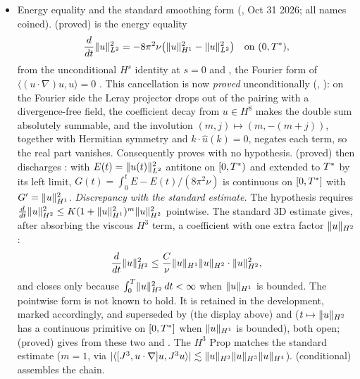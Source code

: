 \documentclass[11pt]{article}
\begin{document}
\begin{itemize}
\item Energy equality and the standard smoothing form (, Oct 31 2026; all names coined).  (proved) is the energy equality
\begin{equation}
\frac{d}{dt}\lVert u\rVert_{L^2}^2=-8\pi^2\nu\bigl(\lVert u\rVert_{H^1}^2-\lVert u\rVert_{L^2}^2\bigr)\quad\text{on }(0,T^{*}),
\end{equation}
from the unconditional $H^s$ identity at $s=0$ and , the Fourier form of $\langle (u\cdot\nabla)u,u\rangle=0$ \cite{Leray1934,Temam1977}. This cancellation is now \emph{proved} unconditionally (, ): on the Fourier side the Leray projector drops out of the pairing with a divergence-free field, the coefficient decay from $u\in H^8$ makes the double sum absolutely summable, and the involution $(m,j)\mapsto(m,-(m+j))$, together with Hermitian symmetry and $k\cdot\hat u(k)=0$, negates each term, so the real part vanishes. Consequently  proves  with no hypothesis.  (proved) then discharges : with $E(t)=\lVert u(t)\rVert_{L^2}^2$ antitone on $[0,T^{*})$ and extended to $T^{*}$ by its left limit, $G(t)=\int_0^t E-E(t)/(8\pi^2\nu)$ is continuous on $[0,T^{*}]$ with $G'=\lVert u\rVert_{H^1}^2$.
\emph{Discrepancy with the standard estimate.} The hypothesis  requires $\frac{d}{dt}\lVert u\rVert_{H^2}^2\le K(1+\lVert u\rVert_{H^1}^2)^m\lVert u\rVert_{H^2}^2$ pointwise. The standard 3D estimate \cite{Temam1995,RRS2016} gives, after absorbing the viscous $H^3$ term, a coefficient with one extra factor $\lVert u\rVert_{H^2}$:
\begin{equation}
\frac{d}{dt}\lVert u\rVert_{H^2}^2\le \frac{C}{\nu}\lVert u\rVert_{H^1}\lVert u\rVert_{H^2}\cdot\lVert u\rVert_{H^2}^2 ,
\end{equation}
and closes only because $\int_0^T\lVert u\rVert_{H^2}^2\,dt<\infty$ when $\lVert u\rVert_{H^1}$ is bounded. The pointwise form is not known to hold. It is retained in the development, marked accordingly, and superseded by  (the display above) and  ($t\mapsto\lVert u\rVert_{H^2}$ has a continuous primitive on $[0,T^{*}]$ when $\lVert u\rVert_{H^1}$ is bounded), both open;  (proved) gives  from these two and . The $H^3$ Prop matches the standard estimate ($m=1$, via $\lvert\langle[J^3,u\cdot\nabla]u,J^3u\rangle\rvert\lesssim\lVert u\rVert_{H^2}\lVert u\rVert_{H^3}\lVert u\rVert_{H^4}$).  (conditional) assembles the chain.

\end{itemize}
\end{document}
